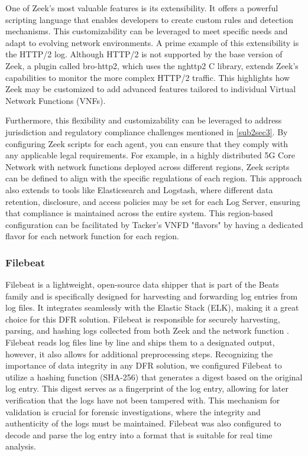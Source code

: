 \documentclass[final,1p,times,authoryear]{elsarticle}
\begin{document}
\vspace{1em}

One of Zeek's most valuable features is its extensibility. It offers a powerful scripting language that enables developers to create custom rules and detection mechanisms. This customizability can be leveraged to meet specific needs and adapt to evolving network environments. A prime example of this extensibility is the HTTP/2 log. Although HTTP/2 is not supported by the base version of Zeek, a plugin called bro-http2, which uses the nghttp2 C library, extends Zeek's capabilities to monitor the more complex HTTP/2 traffic. This highlights how Zeek may be customized to add advanced features tailored to individual Virtual Network Functions (VNFs).

\vspace{1em}

Furthermore, this flexibility and customizability can be leveraged to address jurisdiction and regulatory compliance challenges mentioned in \ref{sub2sec3}. By configuring Zeek scripts for each agent, you can ensure that they comply with any applicable legal requirements. For example, in a highly distributed 5G Core Network with network functions deployed across different regions, Zeek scripts can be defined to align with the specific regulations of each region. This approach also extends to tools like Elasticsearch and Logstash, where different data retention, disclosure, and access policies may be set for each Log Server, ensuring that compliance is maintained across the entire system. This region-based configuration can be facilitated by Tacker's VNFD "flavors" by having a dedicated flavor for each network function for each region.

\subsubsection{Filebeat}
\label{sub3sub3sec2}
Filebeat is a lightweight, open-source data shipper that is part of the Beats family and is specifically designed for harvesting and forwarding log entries from log files. It integrates seamlessly with the Elastic Stack (ELK), making it a great choice for this DFR solution. Filebeat is responsible for securely harvesting, parsing, and hashing logs collected from both Zeek and the network function . Filebeat reads log files line by line and ships them to a designated output, however, it also allows for additional preprocessing steps. Recognizing the importance of data integrity in any DFR solution, we configured Filebeat to utilize a hashing function (SHA-256) that generates a digest based on the original log entry. This digest serves as a fingerprint of the log entry, allowing for later verification that the logs have not been tampered with. This mechanism for validation is crucial for forensic investigations, where the integrity and authenticity of the logs must be maintained. Filebeat was also configured to decode and parse the log entry into a format that is suitable for real time analysis.
\end{document}
